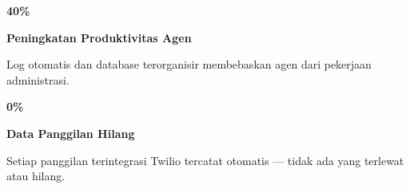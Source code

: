 \documentclass[a4paper]{article}
\begin{document}
\noindent
\begin{minipage}[t]{0.485\textwidth}
    \noindent\colorbox{BlueBg}{%
        \begin{minipage}[t][2.7cm][c]{\dimexpr\linewidth-2\fboxsep\relax}
            \centering
            {\fontsize{20}{24}\selectfont\bfseries\color{CrimsonPrimary} 40\%}\par\vspace{2pt}
            {\fontsize{9.5}{12}\selectfont\bfseries\color{BlueDark} Peningkatan Produktivitas Agen}\par\vspace{2pt}
            {\fontsize{8.5}{11}\selectfont\color{TextDark}Log otomatis dan database terorganisir membebaskan agen dari pekerjaan administrasi.}
        \end{minipage}}\par
    \vspace{6pt}
    \noindent\colorbox{BlueBg}{%
        \begin{minipage}[t][2.7cm][c]{\dimexpr\linewidth-2\fboxsep\relax}
            \centering
            {\fontsize{20}{24}\selectfont\bfseries\color{CrimsonPrimary} 0\%}\par\vspace{2pt}
            {\fontsize{9.5}{12}\selectfont\bfseries\color{BlueDark} Data Panggilan Hilang}\par\vspace{2pt}
            {\fontsize{8.5}{11}\selectfont\color{TextDark}Setiap panggilan terintegrasi Twilio tercatat otomatis --- tidak ada yang terlewat atau hilang.}
        \end{minipage}}%
\end{minipage}%
\hfill
\end{document}
